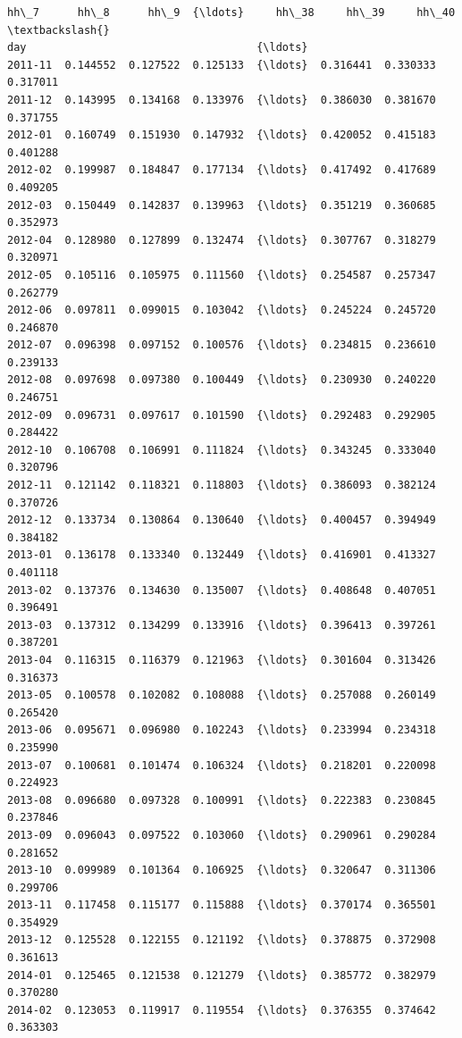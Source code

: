 \documentclass[11pt]{article}
\begin{document}
\begin{tcolorbox}[breakable, size=fbox, boxrule=.5pt, pad at break*=1mm, opacityfill=0]
\begin{Verbatim}[commandchars=\\\{\}]
             hh\_7      hh\_8      hh\_9  {\ldots}     hh\_38     hh\_39     hh\_40  \textbackslash{}
day                                    {\ldots}
2011-11  0.144552  0.127522  0.125133  {\ldots}  0.316441  0.330333  0.317011
2011-12  0.143995  0.134168  0.133976  {\ldots}  0.386030  0.381670  0.371755
2012-01  0.160749  0.151930  0.147932  {\ldots}  0.420052  0.415183  0.401288
2012-02  0.199987  0.184847  0.177134  {\ldots}  0.417492  0.417689  0.409205
2012-03  0.150449  0.142837  0.139963  {\ldots}  0.351219  0.360685  0.352973
2012-04  0.128980  0.127899  0.132474  {\ldots}  0.307767  0.318279  0.320971
2012-05  0.105116  0.105975  0.111560  {\ldots}  0.254587  0.257347  0.262779
2012-06  0.097811  0.099015  0.103042  {\ldots}  0.245224  0.245720  0.246870
2012-07  0.096398  0.097152  0.100576  {\ldots}  0.234815  0.236610  0.239133
2012-08  0.097698  0.097380  0.100449  {\ldots}  0.230930  0.240220  0.246751
2012-09  0.096731  0.097617  0.101590  {\ldots}  0.292483  0.292905  0.284422
2012-10  0.106708  0.106991  0.111824  {\ldots}  0.343245  0.333040  0.320796
2012-11  0.121142  0.118321  0.118803  {\ldots}  0.386093  0.382124  0.370726
2012-12  0.133734  0.130864  0.130640  {\ldots}  0.400457  0.394949  0.384182
2013-01  0.136178  0.133340  0.132449  {\ldots}  0.416901  0.413327  0.401118
2013-02  0.137376  0.134630  0.135007  {\ldots}  0.408648  0.407051  0.396491
2013-03  0.137312  0.134299  0.133916  {\ldots}  0.396413  0.397261  0.387201
2013-04  0.116315  0.116379  0.121963  {\ldots}  0.301604  0.313426  0.316373
2013-05  0.100578  0.102082  0.108088  {\ldots}  0.257088  0.260149  0.265420
2013-06  0.095671  0.096980  0.102243  {\ldots}  0.233994  0.234318  0.235990
2013-07  0.100681  0.101474  0.106324  {\ldots}  0.218201  0.220098  0.224923
2013-08  0.096680  0.097328  0.100991  {\ldots}  0.222383  0.230845  0.237846
2013-09  0.096043  0.097522  0.103060  {\ldots}  0.290961  0.290284  0.281652
2013-10  0.099989  0.101364  0.106925  {\ldots}  0.320647  0.311306  0.299706
2013-11  0.117458  0.115177  0.115888  {\ldots}  0.370174  0.365501  0.354929
2013-12  0.125528  0.122155  0.121192  {\ldots}  0.378875  0.372908  0.361613
2014-01  0.125465  0.121538  0.121279  {\ldots}  0.385772  0.382979  0.370280
2014-02  0.123053  0.119917  0.119554  {\ldots}  0.376355  0.374642  0.363303


\end{Verbatim}
\end{tcolorbox}
\end{document}
